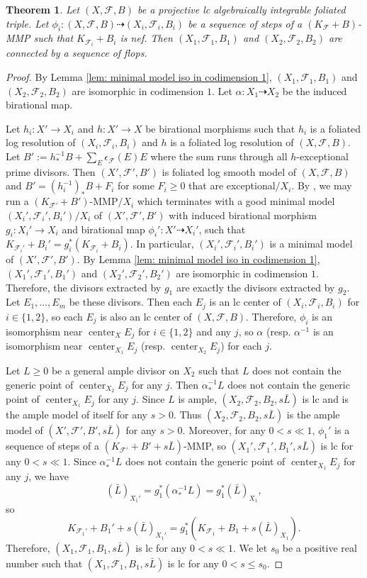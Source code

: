 \documentclass[11pt]{amsart}
\numberwithin{equation}{section}
\newcommand{\Center}{\operatorname{center}}
\newcommand{\Ff}{\mathcal{F}}
\newtheorem{thm}{Theorem}[section]
\theoremstyle{definition}
\theoremstyle{definition}
\theoremstyle{definition}
\begin{document}
\begin{thm}
Let $(X,\Ff,B)$ be a projective lc algebraically integrable foliated triple. Let $\phi_i: (X,\Ff,B)\dashrightarrow (X_i,\Ff_i,B_i)$ be a sequence of steps of a $(K_{\Ff}+B)$-MMP such that $K_{\Ff_i}+B_i$ is nef. Then $(X_1,\Ff_1,B_1)$ and $(X_2,\Ff_2,B_2)$ are connected by a sequence of flops.
\end{thm}
\begin{proof}
By Lemma \ref{lem: minimal model iso in codimension 1}, $(X_1,\Ff_1,B_1)$ and $(X_2,\Ff_2,B_2)$ are isomorphic in codimension $1$. Let $\alpha: X_1\dashrightarrow X_2$ be the induced birational map.

Let $h_i: X'\rightarrow X_i$ and $h: X'\rightarrow X$ be birational morphisms such that $h_i$ is a foliated log resolution of $(X_i,\Ff_i,B_i)$ and $h$ is a foliated log resolution of $(X,\Ff,B)$. Let $B':=h^{-1}_*B+\sum_E\epsilon_{\Ff}(E)E$ where the sum runs through all $h$-exceptional prime divisors. Then $(X',\Ff',B')$ is foliated log smooth model of $(X,\Ff,B)$ and $B'=(h_i^{-1})_*B+F_i$ for some $F_i\geq 0$ that are exceptional$/X_i$. By \cite[Lemma 4.13]{LMX24}, we may run a $(K_{\Ff'}+B')$-MMP$/X_i$ which terminates with a good minimal model $(X_i',\Ff_i',B_i')/X_i$ of $(X',\Ff',B')$ with induced birational morphism $g_i: X_i'\rightarrow X_i$ and birational map $\phi_i': X'\dashrightarrow X_i'$, such that $K_{\Ff_i'}+B_i'=g_i^*(K_{\Ff_i}+B_i)$. In particular, $(X_i',\Ff_i',B_i')$ is a minimal model of $(X',\Ff',B')$. By  Lemma \ref{lem: minimal model iso in codimension 1}, $(X_1',\Ff_1',B_1')$ and $(X_2',\Ff_2',B_2')$ are isomorphic in codimension $1$. Therefore, the divisors extracted by $g_1$ are exactly the divisors extracted by $g_2$. Let $E_1,\dots,E_m$ be these divisors. Then each $E_j$ is an lc center of $(X_i,\Ff_i,B_i)$ for $i\in\{1,2\}$, so each $E_j$ is also an lc center of $(X,\Ff,B)$. Therefore, $\phi_i$ is an isomorphism near $\Center_XE_j$ for $i\in\{1,2\}$ and any $j$, so $\alpha$ (resp. $\alpha^{-1}$ is an isomorphism near $\Center_{X_1}E_j$ (resp. $\Center_{X_2}E_j$) for each $j$.

Let $L\geq 0$ be a general ample divisor on $X_2$ such that $L$ does not contain the generic point of $\Center_{X_2}E_j$ for any $j$. Then $\alpha^{-1}_*L$ does not contain the generic point of $\Center_{X_1}E_j$ for any $j$. Since $L$ is ample, $(X_2,\Ff_2,B_2,s\bar L)$ is lc and is the ample model of itself for any $s>0$. Thus $(X_2,\Ff_2,B_2,s\bar L)$ is the ample model of $(X',\Ff',B',s\bar L)$ for any $s>0$. Moreover, for any $0<s\ll 1$, $\phi_1'$ is a sequence of steps of a $(K_{\Ff'}+B'+s\bar L)$-MMP, so $(X_1',\Ff_1',B_1',s\bar L)$ is lc for any $0<s\ll 1$. Since  $\alpha^{-1}_*L$ does not contain the generic point of $\Center_{X_1}E_j$ for any $j$, we have $$(\bar L)_{X_1'}=g_1^*(\alpha^{-1}_*L)=g_1^*(\bar L)_{X_1},$$
so
$$K_{\Ff_1'}+B_1'+s(\bar L)_{X_1'}=g_1^*(K_{\Ff_1}+B_1+s(\bar L)_{X_1}).$$
Therefore, $(X_1,\Ff_1,B_1,s\bar L)$ is lc for any $0<s\ll 1$. We let $s_0$ be a positive real number such that  $(X_1,\Ff_1,B_1,s\bar L)$ is lc for any $0<s\leq s_0$.


\end{proof}
\end{document}
